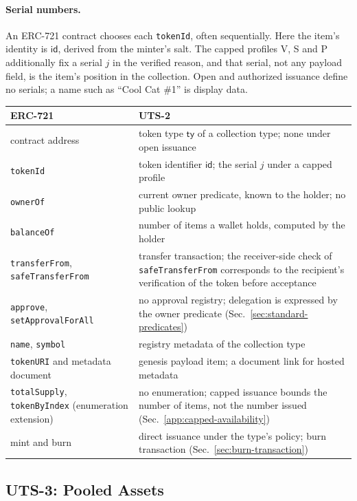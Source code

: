 \paragraph{Serial numbers.} An ERC-721 contract chooses each \texttt{tokenId}, often sequentially. Here the item's identity is $\mathsf{id}$, derived from the minter's salt. The capped profiles V, S and P additionally fix a serial $j$ in the verified reason, and that serial, not any payload field, is the item's position in the collection. Open and authorized issuance define no serials; a name such as ``Cool Cat \#1'' is display data.

\begin{longtable}{>{\raggedright\arraybackslash}p{4.6cm}>{\raggedright\arraybackslash}p{9.6cm}}
\textbf{ERC-721} & \textbf{UTS-2} \\
\hline
\endhead
contract address & token type $\mathsf{ty}$ of a collection type; none under open issuance \\
\texttt{tokenId} & token identifier $\mathsf{id}$; the serial $j$ under a capped profile \\
\texttt{ownerOf} & current owner predicate, known to the holder; no public lookup \\
\texttt{balanceOf} & number of items a wallet holds, computed by the holder \\
\texttt{transferFrom}, \texttt{safeTransferFrom} & transfer transaction; the receiver-side check of \texttt{safeTransferFrom} corresponds to the recipient's verification of the token before acceptance \\
\texttt{approve}, \texttt{setApprovalForAll} & no approval registry; delegation is expressed by the owner predicate (Sec.~\ref{sec:standard-predicates}) \\
\texttt{name}, \texttt{symbol} & registry metadata of the collection type \\
\texttt{tokenURI} and metadata document & genesis payload item; a document link for hosted metadata \\
\texttt{totalSupply}, \texttt{tokenByIndex} (enumeration extension) & no enumeration; capped issuance bounds the number of items, not the number issued (Sec.~\ref{app:capped-availability}) \\
mint and burn & direct issuance under the type's policy; burn transaction (Sec.~\ref{sec:burn-transaction}) \\
\end{longtable}

\subsection{UTS-3: Pooled Assets}\label{app:uts-pool}

